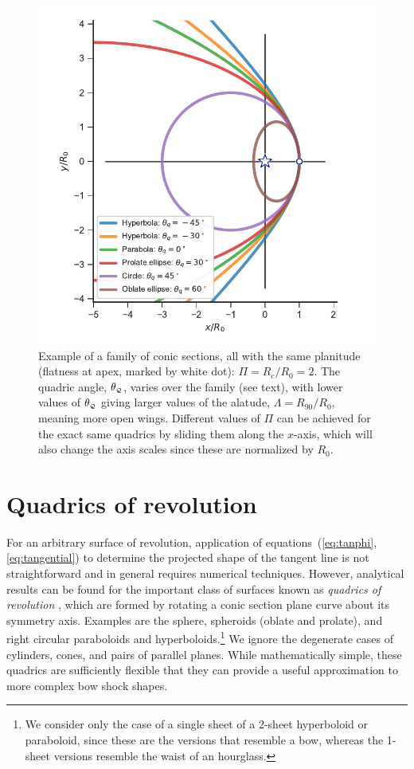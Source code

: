 \begin{figure}
  \includegraphics[width=\linewidth]{figs/conic1}
  \caption[]{Example of a family of conic sections, all with the same
    planitude (flatness at apex, marked by white dot):
    \(\Pi = R_c/R_0 = 2 \). The quadric angle, \(\theta_{\scriptscriptstyle \mathcal{Q}}\), varies over
    the family (see text), with lower values of \(\theta_{\scriptscriptstyle \mathcal{Q}}\) giving
    larger values of the alatude, \(\Lambda = R_{90}/R_0 \), meaning more
    open wings.  Different values of \(\Pi\) can be achieved for the
    exact same quadrics by sliding them along the \(x\)-axis, which
    will also change the axis scales since these are normalized by
    \(R_0\).}
  \label{fig:conics-family}
\end{figure}


\section{Quadrics of revolution}
\label{sec:conic}


For an arbitrary surface of revolution, application of
equations~(\ref{eq:tanphi}, \ref{eq:tangential}) to determine the
projected shape of the tangent line is not straightforward and in
general requires numerical techniques.  However, analytical results
can be found for the important class of surfaces known as
\textit{quadrics of revolution} \citep{Goldman:1983a, Gfrerrer:2009a},
which are formed by rotating a conic section plane curve about its
symmetry axis.  Examples are the sphere, spheroids (oblate and
prolate), and right circular paraboloids and hyperboloids.\footnote{We
  consider only the case of a single sheet of a 2-sheet hyperboloid or
  paraboloid, since these are the versions that resemble a bow,
  whereas the 1-sheet versions resemble the waist of an hourglass.}
We ignore the degenerate cases of cylinders, cones, and pairs of
parallel planes.  While mathematically simple, these quadrics are
sufficiently flexible that they can provide a useful approximation to
more complex bow shock shapes.

